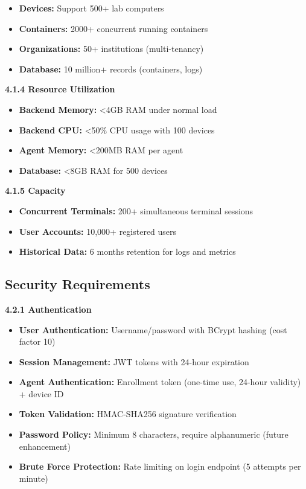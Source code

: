 \documentclass[12pt,a4paper]{article}
\begin{document}
\begin{itemize}[noitemsep]
    \item \textbf{Devices:} Support 500+ lab computers
    \item \textbf{Containers:} 2000+ concurrent running containers
    \item \textbf{Organizations:} 50+ institutions (multi-tenancy)
    \item \textbf{Database:} 10 million+ records (containers, logs)
\end{itemize}

\textbf{4.1.4 Resource Utilization}

\begin{itemize}[noitemsep]
    \item \textbf{Backend Memory:} <4GB RAM under normal load
    \item \textbf{Backend CPU:} <50\% CPU usage with 100 devices
    \item \textbf{Agent Memory:} <200MB RAM per agent
    \item \textbf{Database:} <8GB RAM for 500 devices
\end{itemize}

\textbf{4.1.5 Capacity}

\begin{itemize}[noitemsep]
    \item \textbf{Concurrent Terminals:} 200+ simultaneous terminal sessions
    \item \textbf{User Accounts:} 10,000+ registered users
    \item \textbf{Historical Data:} 6 months retention for logs and metrics
\end{itemize}

\subsection{Security Requirements}

\textbf{4.2.1 Authentication}

\begin{itemize}[noitemsep]
    \item \textbf{User Authentication:} Username/password with BCrypt hashing (cost factor 10)
    \item \textbf{Session Management:} JWT tokens with 24-hour expiration
    \item \textbf{Agent Authentication:} Enrollment token (one-time use, 24-hour validity) + device ID
    \item \textbf{Token Validation:} HMAC-SHA256 signature verification
    \item \textbf{Password Policy:} Minimum 8 characters, require alphanumeric (future enhancement)
    \item \textbf{Brute Force Protection:} Rate limiting on login endpoint (5 attempts per minute)
\end{itemize}
\end{document}

